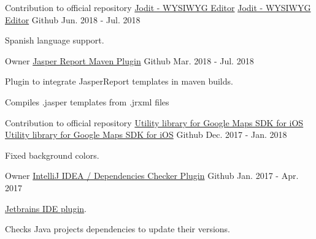 \begin{cventries}
  \cventry
    {Contribution to official repository \href{https://github.com/xdan/jodit}{Jodit - WYSIWYG Editor}} %
    {\href{https://github.com/zp1ke/jodit}{Jodit - WYSIWYG Editor}} %
    {\faGithubSquare\acvHeaderIconSep Github} %
    {Jun. 2018 - Jul. 2018} %
    {
      \begin{cvitems} %
        \item {Spanish language support.}
      \end{cvitems}
    }

  \cventry
    {Owner} %
    {\href{https://github.com/zp1ke/jasperreport-maven-plugin}{Jasper Report Maven Plugin}} %
    {\faGithubSquare\acvHeaderIconSep Github} %
    {Mar. 2018 - Jul. 2018} %
    {
      \begin{cvitems} %
        \item {Plugin to integrate JasperReport templates in maven builds.}
        \item {Compiles .jasper templates from .jrxml files}
      \end{cvitems}
    }

  \cventry
    {Contribution to official repository \href{https://github.com/googlemaps/google-maps-ios-utils}{Utility library for Google Maps SDK for iOS}} %
    {\faMapMarker \hphantom{-} \href{https://github.com/zp1ke/google-maps-ios-utils}{Utility library for Google Maps SDK for iOS}} %
    {\faGithubSquare\acvHeaderIconSep Github} %
    {Dec. 2017 - Jan. 2018} %
    {
      \begin{cvitems} %
        \item {Fixed background colors.}
      \end{cvitems}
    }

  \cventry
    {Owner} %
    {\href{https://github.com/zp1ke/deps-checker}{IntelliJ IDEA / Dependencies Checker Plugin}} %
    {\faGithubSquare\acvHeaderIconSep Github} %
    {Jan. 2017 - Apr. 2017} %
    {
      \begin{cvitems} %
        \item {\href{https://plugins.jetbrains.com/plugin/9481-java-dependencies-checker}{Jetbrains IDE plugin}.}
        \item {Checks Java projects dependencies to update their versions.}
      \end{cvitems}
    }


\end{cventries}
